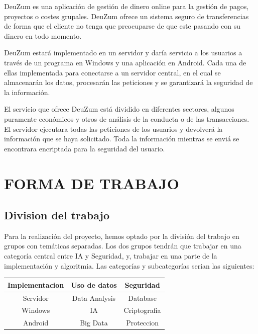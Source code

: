 \documentclass{article}
\theoremstyle{definition}
\begin{document}
DeuZum es una aplicación de gestión de dinero online para la gestión de pagos, proyectos o costes grupales. DeuZum ofrece un sistema seguro de transferencias de forma que el cliente no tenga que preocuparse de que este pasando con su dinero en todo momento.

DeuZum estará implementado en un servidor y daría servicio a los usuarios a través de un programa en Windows y una aplicación en Android. Cada una de ellas implementada para conectarse a un servidor central, en el cual se almacenarán los datos, procesarán las peticiones y se garantizará la seguridad de la información.

El servicio que ofrece DeuZum está dividido en diferentes sectores, algunos puramente económicos y otros de análisis de la conducta o de las transacciones. El servidor ejecutara todas las peticiones de los usuarios y devolverá la información que se haya solicitado. Toda la información mientras se enviá se encontrara encriptada para la seguridad del usuario.

\section{FORMA DE TRABAJO}


\subsection{Division del trabajo}

Para la realización del proyecto, hemos optado por la división del trabajo en grupos con temáticas separadas. Los dos grupos tendrán que trabajar en una categoría central entre IA y Seguridad, y, trabajar en una parte de la implementación y algoritmia. Las categorías y subcategorías serian las siguientes:

\begin{center}
\begin{tabular}{|c|c|c|}
	\hline	
	\cellcolor{cyan!12} Implementacion & \cellcolor{cyan!12}Uso de datos & \cellcolor{cyan!12}Seguridad \\ \hline
	Servidor & Data Analysis & Database \\
	Windows & IA & Criptografia \\
	Android & Big Data & Proteccion \\
	\hline
	
\end{tabular}
\end{center}
\end{document}
